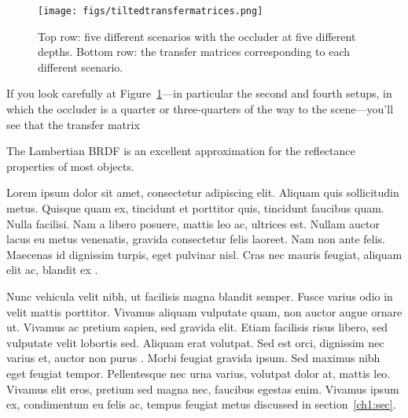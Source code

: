 \begin{figure}
\begin{center}
\texttt{[image: figs/tiltedtransfermatrices.png]}
\caption{Top row: five different scenarios with the occluder at five different depths. Bottom row: the transfer matrices corresponding to each different scenario. \label{fig:tiltedtransfermatrices}}
\end{center}
\end{figure}
    
If you look carefully at Figure~\ref{fig:tiltedtransfermatrices}---in particular the second and fourth setups, in which the occluder is a quarter or three-quarters of the way to the scene---you'll see that the transfer matrix 
    





    
    
    
    






    





The Lambertian BRDF is an excellent approximation for the reflectance properties of most objects.









Lorem ipsum dolor sit amet, consectetur adipiscing elit. Aliquam quis sollicitudin metus. Quisque quam ex, tincidunt et porttitor quis, tincidunt faucibus quam. Nulla facilisi. Nam a libero posuere, mattis leo ac, ultrices est. Nullam auctor lacus eu metus venenatis, gravida consectetur felis laoreet. Nam non ante felis. Maecenas id dignissim turpis, eget pulvinar nisl. Cras nec mauris feugiat, aliquam elit ac, blandit ex \cite{article-full}.

Nunc vehicula velit nibh, ut facilisis magna blandit semper. Fusce varius odio in velit mattis porttitor. Vivamus aliquam vulputate quam, non auctor augue ornare ut. Vivamus ac pretium sapien, sed gravida elit. Etiam facilisis risus libero, sed vulputate velit lobortis sed. Aliquam erat volutpat. Sed est orci, dignissim nec varius et, auctor non purus \cite{proceedings-minimal,phdthesis-full}. Morbi feugiat gravida ipsum. Sed maximus nibh eget feugiat tempor. Pellentesque nec urna varius, volutpat dolor at, mattis leo. Vivamus elit eros, pretium sed magna nec, faucibus egestas enim. Vivamus ipsum ex, condimentum eu felis ac, tempus feugiat metus discussed in section~\ref{ch1:sec}.

